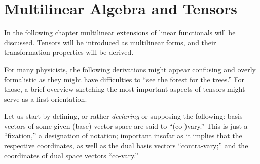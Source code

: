 \chapter{Multilinear Algebra and Tensors}
\label{ch:t}


In the following chapter multilinear extensions of linear functionals will be discussed.
Tensors will be introduced as multilinear forms,
and their transformation properties will be derived.


For many physicists, the following derivations might appear confusing and overly formalistic
as they might have difficulties to ``see the forest for the trees.''
For those, a brief overview sketching the most important aspects of tensors might serve as a first orientation.

Let us start by defining, or rather {\em declaring} or supposing the following:  basis vectors of some given (base) vector space are said to ``(co-)vary.''
This is just a ``fixation,'' a designation of notation;
important insofar as it implies that the respective coordinates, as well as the dual basis vectors ``contra-vary;''
and the coordinates of dual space vectors ``co-vary.''

